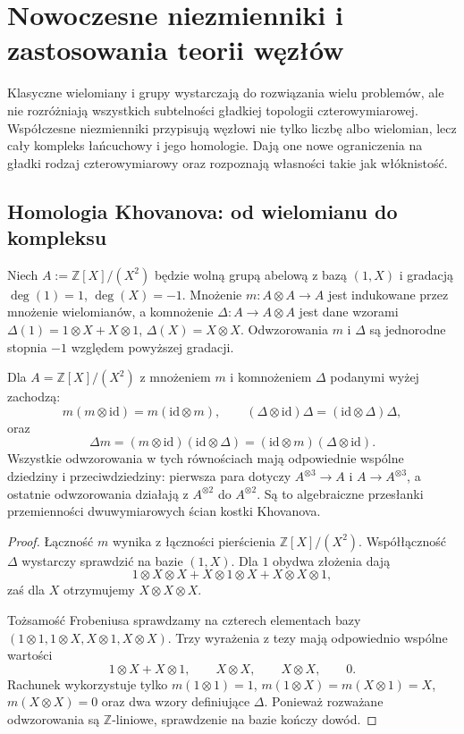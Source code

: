 \chapter{Nowoczesne niezmienniki i zastosowania teorii węzłów}
\label{ch:kt-nowoczesne}

Klasyczne wielomiany i grupy wystarczają do rozwiązania wielu
problemów, ale nie rozróżniają wszystkich subtelności gładkiej
topologii czterowymiarowej. Współczesne niezmienniki przypisują
węzłowi nie tylko liczbę albo wielomian, lecz cały kompleks
łańcuchowy i jego homologie. Dają one nowe ograniczenia
na gładki rodzaj czterowymiarowy oraz rozpoznają własności
takie jak włóknistość.

\section{Homologia Khovanova: od wielomianu do kompleksu}
\label{sec:kt-khovanov}

\begin{definicja}
Niech $A:=\mathbb Z[X]/(X^2)$ będzie wolną grupą abelową
z bazą $(1,X)$ i gradacją $\deg(1)=1$, $\deg(X)=-1$.
Mnożenie $m\colon A\otimes A\to A$ jest indukowane przez
mnożenie wielomianów, a komnożenie
$\Delta\colon A\to A\otimes A$ jest dane wzorami
$\Delta(1)=1\otimes X+X\otimes1$,
$\Delta(X)=X\otimes X$. Odwzorowania $m$ i $\Delta$
są jednorodne stopnia $-1$ względem powyższej gradacji.
\end{definicja}

\begin{lemat}
\label{lem:kt-khovanov-frobenius}
Dla $A=\mathbb Z[X]/(X^2)$ z mnożeniem $m$
i komnożeniem $\Delta$ podanymi wyżej zachodzą:
\[
m(m\otimes\mathrm{id})
=m(\mathrm{id}\otimes m),\qquad
(\Delta\otimes\mathrm{id})\Delta
=(\mathrm{id}\otimes\Delta)\Delta,
\]
oraz
\[
\Delta m=(m\otimes\mathrm{id})
(\mathrm{id}\otimes\Delta)
=(\mathrm{id}\otimes m)
(\Delta\otimes\mathrm{id}).
\]
Wszystkie odwzorowania w tych równościach
mają odpowiednie wspólne dziedziny i
przeciwdziedziny: pierwsza para dotyczy
$A^{\otimes3}\to A$ i $A\to A^{\otimes3}$,
a ostatnie odwzorowania działają
z $A^{\otimes2}$ do $A^{\otimes2}$.
Są to algebraiczne przesłanki przemienności
dwuwymiarowych ścian kostki Khovanova.
\end{lemat}

\begin{proof}
Łączność $m$ wynika z łączności pierścienia
$\mathbb Z[X]/(X^2)$. Współłączność $\Delta$
wystarczy sprawdzić na bazie $(1,X)$.
Dla $1$ obydwa złożenia dają
\[
1\otimes X\otimes X
+X\otimes1\otimes X
+X\otimes X\otimes1,
\]
zaś dla $X$ otrzymujemy
$X\otimes X\otimes X$.

Tożsamość Frobeniusa sprawdzamy na
czterech elementach bazy
$(1\otimes1,1\otimes X,
X\otimes1,X\otimes X)$.
Trzy wyrażenia z tezy mają
odpowiednio wspólne wartości
\[
1\otimes X+X\otimes1,\qquad
X\otimes X,\qquad
X\otimes X,\qquad 0.
\]
Rachunek wykorzystuje tylko
$m(1\otimes1)=1$,
$m(1\otimes X)=m(X\otimes1)=X$,
$m(X\otimes X)=0$ oraz
dwa wzory definiujące $\Delta$.
Ponieważ rozważane odwzorowania
są $\mathbb Z$-liniowe,
sprawdzenie na bazie
kończy dowód.
\end{proof}

